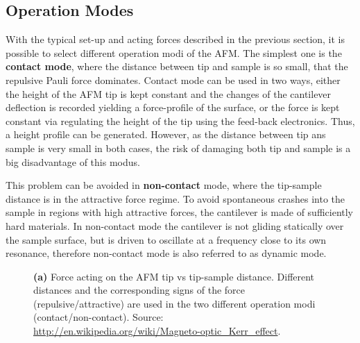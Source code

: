 \documentclass[a4paper]{scrartcl}
\numberwithin{equation}{section}
\numberwithin{figure}{section}
\numberwithin{table}{section}
\begin{document}
\subsection{Operation Modes}  
With the typical set-up and acting forces described in the previous section, it is possible to select different operation modi of the AFM. The simplest one is the \textbf{contact mode}, where the distance between tip and sample is so small, that the repulsive Pauli force dominates. Contact mode can be used in two ways, either the height of the AFM tip is kept constant and the changes of the cantilever deflection is recorded yielding a force-profile of the surface, or the force is kept constant via regulating the height of the tip using the feed-back electronics. Thus, a height profile can be generated. However, as the distance between tip ans sample is very small in both cases, the risk of damaging both tip and sample is a big disadvantage of this modus. 

This problem can be avoided in \textbf{non-contact} mode, where the tip-sample distance is in the attractive force regime. To avoid spontaneous crashes into the sample in regions with high attractive forces, the cantilever is made of sufficiently hard materials. In non-contact mode the cantilever is not gliding statically over the sample surface, but is driven to oscillate at a frequency close to its own resonance, therefore non-contact mode is also referred to as dynamic mode.

\begin{figure} 
 \centering
{}
\caption{
\small \textbf{(a)} Force acting on the AFM tip vs tip-sample distance. Different distances and the corresponding signs of the force (repulsive/attractive) are used in the two different operation modi (contact/non-contact).
Source: \url{http://en.wikipedia.org/wiki/Magneto-optic_Kerr_effect}. } 
	\label{fig:forces}
\end{figure}
\end{document}
